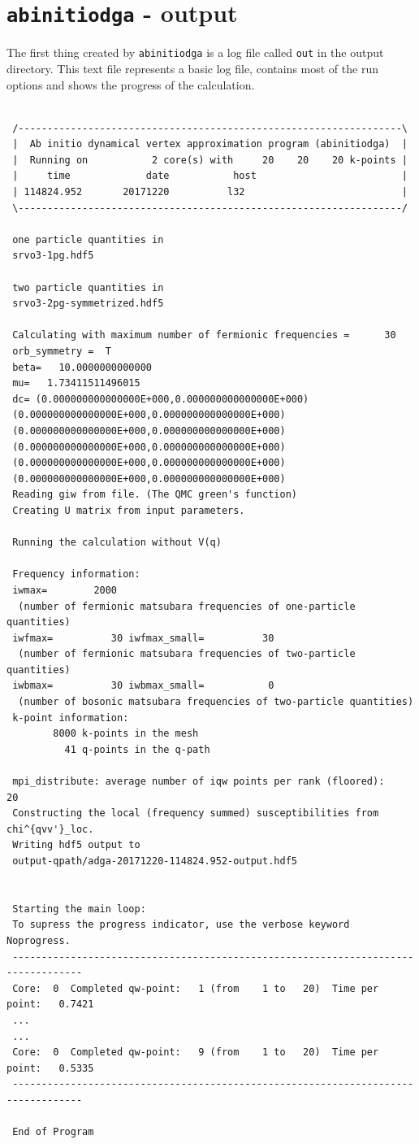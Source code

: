 \documentclass[a4paper,11pt]{article}
\numberwithin{equation}{section} %
\begin{document}
\section{\protect\Verb+abinitiodga+ - output}
The first thing created by \verb+abinitiodga+ is a log file called \verb+out+ in the output directory. This text file represents a basic log file, contains most of the run options and shows the progress of the calculation.

\begin{lstlisting}[caption=ADGA log file, frame=single, basicstyle=\footnotesize, label={lst:out}]

 /------------------------------------------------------------------\ 
 |  Ab initio dynamical vertex approximation program (abinitiodga)  |
 |  Running on           2 core(s) with     20    20    20 k-points |
 |     time             date           host                         |
 | 114824.952       20171220          l32                           |
 \------------------------------------------------------------------/

 one particle quantities in
 srvo3-1pg.hdf5

 two particle quantities in
 srvo3-2pg-symmetrized.hdf5

 Calculating with maximum number of fermionic frequencies =      30
 orb_symmetry =  T
 beta=   10.0000000000000
 mu=   1.73411511496015
 dc= (0.000000000000000E+000,0.000000000000000E+000)
 (0.000000000000000E+000,0.000000000000000E+000)
 (0.000000000000000E+000,0.000000000000000E+000)
 (0.000000000000000E+000,0.000000000000000E+000)
 (0.000000000000000E+000,0.000000000000000E+000)
 (0.000000000000000E+000,0.000000000000000E+000)
 Reading giw from file. (The QMC green's function)
 Creating U matrix from input parameters.

 Running the calculation without V(q)

 Frequency information:
 iwmax=        2000
  (number of fermionic matsubara frequencies of one-particle quantities)
 iwfmax=          30 iwfmax_small=          30
  (number of fermionic matsubara frequencies of two-particle quantities)
 iwbmax=          30 iwbmax_small=           0
  (number of bosonic matsubara frequencies of two-particle quantities)
 k-point information:
        8000 k-points in the mesh
          41 q-points in the q-path

 mpi_distribute: average number of iqw points per rank (floored):       20
 Constructing the local (frequency summed) susceptibilities from chi^{qvv'}_loc.
 Writing hdf5 output to
 output-qpath/adga-20171220-114824.952-output.hdf5


 Starting the main loop:
 To supress the progress indicator, use the verbose keyword Noprogress.
 ----------------------------------------------------------------------------------
 Core:  0  Completed qw-point:   1 (from    1 to   20)  Time per point:   0.7421
 ...
 ...
 Core:  0  Completed qw-point:   9 (from    1 to   20)  Time per point:   0.5335
 ----------------------------------------------------------------------------------

 End of Program
\end{lstlisting}
\end{document}

